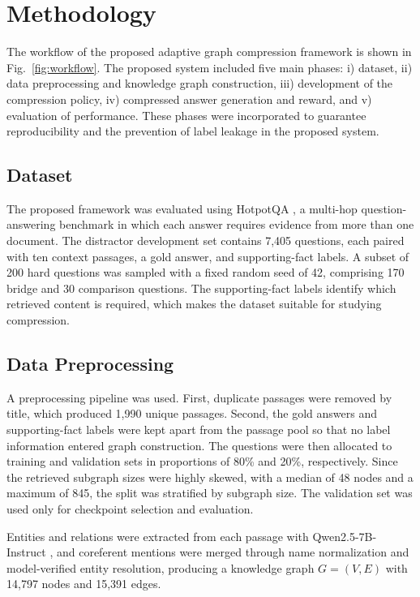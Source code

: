 \documentclass[conference]{IEEEtran}
\begin{document}
\section{Methodology}\label{sec:PS}

The workflow of the proposed adaptive graph compression framework is shown in Fig.~\ref{fig:workflow}. The proposed system included five main phases: i) dataset, ii) data preprocessing and knowledge graph construction, iii) development of the compression policy, iv) compressed answer generation and reward, and v) evaluation of performance. These phases were incorporated to guarantee reproducibility and the prevention of label leakage in the proposed system.

\subsection{Dataset}
The proposed framework was evaluated using HotpotQA \cite{yang2018hotpotqa}, a multi-hop question-answering benchmark in which each answer requires evidence from more than one document. The distractor development set contains 7,405 questions, each paired with ten context passages, a gold answer, and supporting-fact labels. A subset of 200 hard questions was sampled with a fixed random seed of 42, comprising 170 bridge and 30 comparison questions. The supporting-fact labels identify which retrieved content is required, which makes the dataset suitable for studying compression.

\subsection{Data Preprocessing}
A preprocessing pipeline was used. First, duplicate passages were removed by title, which produced 1,990 unique passages. Second, the gold answers and supporting-fact labels were kept apart from the passage pool so that no label information entered graph construction. The questions were then allocated to training and validation sets in proportions of 80\% and 20\%, respectively. Since the retrieved subgraph sizes were highly skewed, with a median of 48 nodes and a maximum of 845, the split was stratified by subgraph size. The validation set was used only for checkpoint selection and evaluation.

Entities and relations were extracted from each passage with Qwen2.5-7B-Instruct \cite{qwen2024technical}, and coreferent mentions were merged through name normalization and model-verified entity resolution, producing a knowledge graph $G=(V,E)$ with 14,797 nodes and 15,391 edges.
\end{document}
